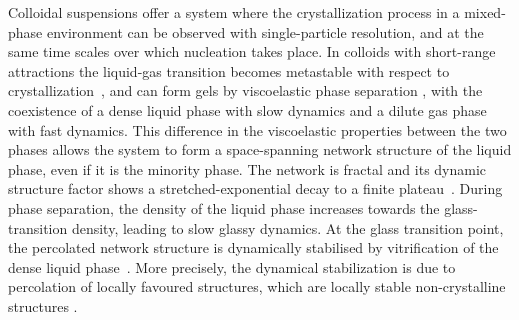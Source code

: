 \documentclass[preprint,amsmath,amssymb,superscriptaddress]{revtex4}
\begin{document}
Colloidal suspensions offer a system where the crystallization process in a mixed-phase environment can be observed with single-particle
resolution, and at the same time scales over which nucleation takes place. In colloids with short-range attractions the liquid-gas transition 
becomes metastable with respect to crystallization~\cite{anderson2002insights,lekkerkerker2011colloids}, and can form gels
by viscoelastic phase separation \cite{tanaka1999colloid,tanaka2000viscoelastic}, with the coexistence of a dense liquid phase with slow dynamics and a dilute gas phase with fast dynamics. 
This difference in the viscoelastic properties between the two phases allows the system to form a space-spanning 
network structure of the liquid phase, even if it is the minority phase. The network is fractal and its dynamic structure factor shows a stretched-exponential decay to a finite
plateau~\cite{krall1998internal,solomon2001dynamic,romer2000sol}. 
During phase separation, the density of the liquid phase increases towards the glass-transition density, leading to slow glassy dynamics.
At the glass transition point, the percolated network structure is dynamically stabilised by vitrification 
of the dense liquid phase~\cite{pusey1993dynamics,piazza1994phase,ilett1995phase,verhaegh1997transient,tanaka1999colloid,foffi2002,buzzaccaro2007sticky,zaccarelli2007,lu2008gelation,zaccarelli2008gelation,testard2011}.  
More precisely, the dynamical stabilization is due to percolation of locally favoured structures, which are locally stable non-crystalline structures \cite{royall2008g}.
\end{document}

